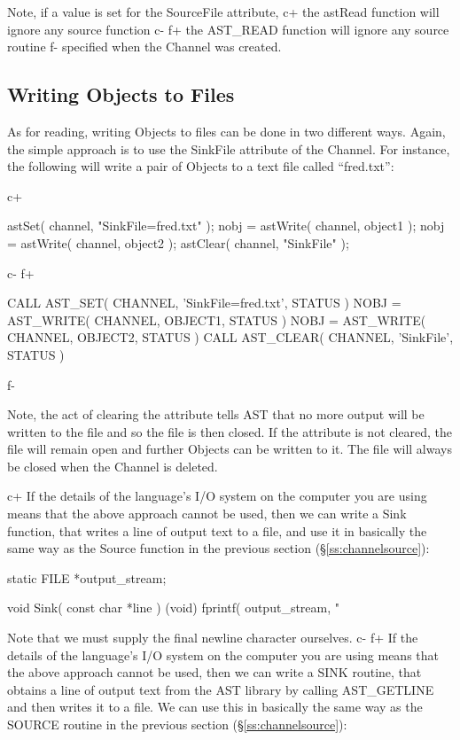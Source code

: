 \documentclass[twoside,11pt]{starlink}
\providecommand{\secref}[1]{\S\ref{#1}}
\begin{document}
{Note, if a value is set for the SourceFile attribute,
c+
the astRead function will ignore any source function
c-
f+
the AST\_READ function will ignore any source routine
f-
specified when the Channel was created.

\subsection{\label{ss:channelsink}Writing Objects to Files}

As for reading, writing Objects to files can be done in two different ways.
Again, the simple approach is to use the SinkFile attribute of the Channel.
For instance, the following will write a pair of Objects to a text file
called ``fred.txt'':

c+
\small
\begin{terminalv}
astSet( channel, "SinkFile=fred.txt" );
nobj = astWrite( channel, object1 );
nobj = astWrite( channel, object2 );
astClear( channel, "SinkFile" );
\end{terminalv}
\normalsize
c-
f+
\small
\begin{terminalv}
   CALL AST_SET( CHANNEL, 'SinkFile=fred.txt', STATUS )
   NOBJ = AST_WRITE( CHANNEL, OBJECT1, STATUS )
   NOBJ = AST_WRITE( CHANNEL, OBJECT2, STATUS )
   CALL AST_CLEAR( CHANNEL, 'SinkFile', STATUS )
\end{terminalv}
\normalsize
f-

Note, the act of clearing the attribute tells AST that no more output
will be written to the file and so the file is then closed. If the
attribute is not cleared, the file will remain open and further Objects
can be written to it. The file will always be closed when the Channel is
deleted.

c+
If the details of the language's I/O system on the computer you are using
means that the above approach cannot be used, then we can write a Sink function,
that writes a line of output text to a file, and use it in basically the same
way as the Source function in the previous section (\secref{ss:channelsource}):

\small
\begin{terminalv}
static FILE *output_stream;

void Sink( const char *line ) {
   (void) fprintf( output_stream, "%
}
\end{terminalv}
\normalsize

Note that we must supply the final newline character ourselves.
c-
f+
If the details of the language's I/O system on the computer you are using
means that the above approach cannot be used, then we can write a SINK routine,
that obtains a line of output text from the AST library by calling AST\_GETLINE
and then writes it to a file. We can use this in basically the same way as
the SOURCE routine in the previous section (\secref{ss:channelsource}):

}
\end{document}
